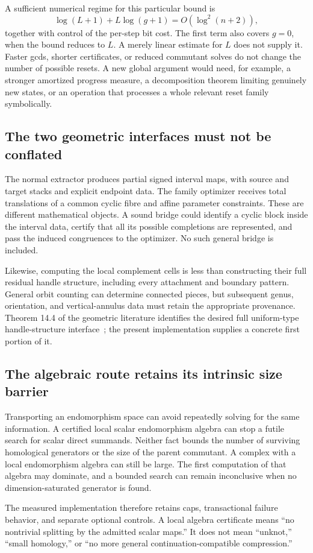 A sufficient numerical regime for this particular bound is
\[
 \log(L+1)+L\log(g+1)=O(\log^2(n+2)),
\]
together with control of the per-step bit cost. The first term also
covers $g=0$, when the bound reduces to $L$. A merely linear estimate
for $L$ does not supply it. Faster gcds, shorter certificates, or reduced
commutant solves do not change the number of possible resets. A new
global argument would need, for example, a stronger amortized progress
measure, a decomposition theorem limiting genuinely new states, or
an operation that processes a whole relevant reset family symbolically.

\subsection{The two geometric interfaces must not be conflated}

The normal extractor produces partial signed interval maps, with source
and target stacks and explicit endpoint data. The family optimizer
receives total translations of a common cyclic fibre and affine
parameter constraints. These are different mathematical objects. A
sound bridge could identify a cyclic block inside the interval data,
certify that all its possible completions are represented, and pass the
induced congruences to the optimizer. No such general bridge is included.

Likewise, computing the local complement cells is less than constructing
their full residual handle structure, including every attachment and
boundary pattern. General orbit counting can determine connected pieces,
but subsequent genus, orientation, and vertical-annulus data must retain
the appropriate provenance. Theorem 14.4 of the geometric literature
identifies the desired full uniform-type handle-structure interface~\cite{lackenby2026}; the present
implementation supplies a concrete first portion of it.

\subsection{The algebraic route retains its intrinsic size barrier}

Transporting an endomorphism space can avoid repeatedly solving for the
same information. A certified local scalar endomorphism algebra can stop
a futile search for scalar direct summands. Neither fact bounds the
number of surviving homological generators or the size of the parent
commutant. A complex with a local endomorphism algebra can still be large.
The first computation of that algebra may dominate, and a bounded search
can remain inconclusive when no dimension-saturated generator is found.

The measured implementation therefore retains caps, transactional failure
behavior, and separate optional controls. A local algebra certificate
means ``no nontrivial splitting by the admitted scalar maps.'' It does
not mean ``unknot,'' ``small homology,'' or ``no more general
continuation-compatible compression.''
